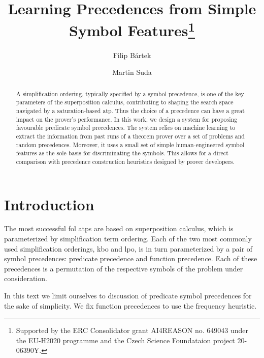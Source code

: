 

\title{Learning Precedences from Simple Symbol Features\thanks{Supported by the ERC Consolidator grant AI4REASON no. 649043 under the EU-H2020 programme and the Czech Science Foundataion project 20-06390Y.}}
\author{Filip B\'{a}rtek \and Martin Suda}



\maketitle

\begin{abstract}
A simplification ordering, typically specified by a symbol precedence,
is one of the key parameters of the superposition calculus, contributing
to shaping the search space navigated by a saturation-based \acrlong{atp}.
Thus the choice of a precedence can have a great impact on the prover's performance.
In this work, we design a system for proposing favourable predicate symbol precedences.
The system relies on machine learning to extract the information from
past runs of a theorem prover over a set of problems and random precedences.
Moreover, it uses a small set of simple human-engineered symbol features as the sole
basis for discriminating the symbols. This allows for a direct comparison
with precedence construction heuristics designed by prover developers.
\end{abstract}

\section{Introduction}

The most successful \gls{fol} \glspl{atp} are based on superposition calculus,
which is parameterized by simplification term ordering.
Each of the two most commonly used simplification orderings, \gls{kbo} and \gls{lpo},
is in turn parameterized by a pair of symbol precedences:
predicate precedence and function precedence.
Each of these precedences is a permutation of the respective symbols of the problem under consideration.

In this text we limit ourselves to discussion of predicate symbol precedences for the sake of simplicity.
We fix function precedences to use the frequency heuristic.

